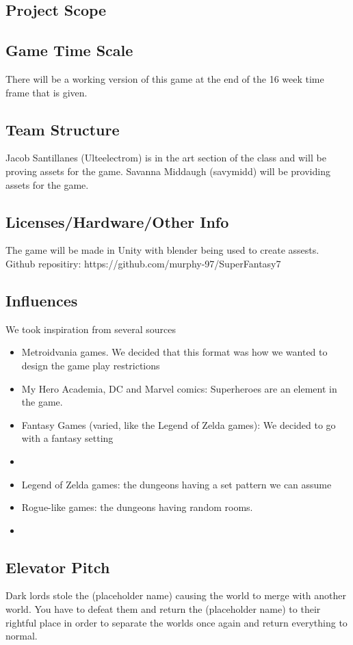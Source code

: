 \documentclass[titlepage]{article}
\begin{document}
\subsection*{Project Scope}

\subsection*{Game Time Scale}
There will be a working version of this game at the end of the 16 week time frame that is given.

\subsection*{Team Structure}
Jacob Santillanes (Ulteelectrom) is in the art section of the class and will be proving assets for the game.
Savanna Middaugh (savymidd) will be providing assets for the game.
\subsection*{Licenses/Hardware/Other Info}
The game will be made in Unity with blender being used to create assests.  \\
Github repositiry: https://github.com/murphy-97/SuperFantasy7

\subsection*{Influences}
We took inspiration from several sources
\begin{itemize}
    \item Metroidvania games. We decided that this format was how we wanted to design the game play restrictions
    \item My Hero Academia, DC and Marvel comics: Superheroes are an element in the game.
    \item Fantasy Games (varied, like the Legend of Zelda games): We decided to go with a fantasy setting
    \item %
    \item Legend of Zelda games: the dungeons having a set pattern we can assume
    \item Rogue-like games: the dungeons having random rooms.
    \item %
\end{itemize}
\subsection*{Elevator Pitch}
Dark lords stole the (placeholder name) causing the world to merge with another world. You have to defeat them and return the (placeholder name) to their rightful place in order to separate the worlds once again and return everything to normal. 
\end{document}
